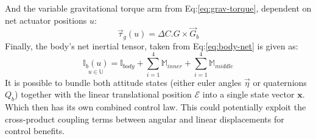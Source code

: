 And the variable gravitational torque arm from Eq:\ref{eq:grav-torque}, dependent on net actuator positions $u$:
\begin{equation}\label{eq:grav-torque}
\vec{\tau}_g(u)=\Delta C.G \times\vec{G}_b
\end{equation}
Finally, the body's net inertial tensor, taken from Eq:\ref{eq:body-net} is given as:
\begin{equation}
\underset{u\in\mathbb{U}}{\mathbb{I}_b(u)}=\mathbb{I}_{body}+\sum_{i=1}^{4} \mathbb{M}_{inner}+\sum_{i=1}^{4} \mathbb{M}_{middle}
\end{equation}
It is possible to bundle both attitude states (either euler angles $\vec{\eta}$ or quaternions $Q_b$) together with the linear translational position $\mathcal{E}$ into a single state vector $\mathbf{x}$. Which then has its own combined control law. This could potentially exploit the cross-product coupling terms between angular and linear displacements for control benefits.